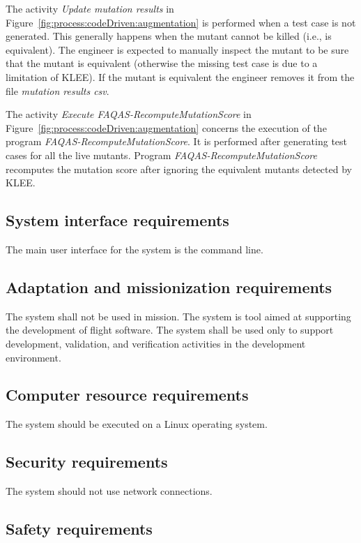 \RQ{} The activity \emph{Update mutation results} in Figure~\ref{fig:process:codeDriven:augmentation} is performed when a test case is not generated. This generally happens when the mutant cannot be killed (i.e., is equivalent). The engineer is expected to manually inspect the mutant to be sure that the mutant is equivalent (otherwise the missing test case is due to a limitation of KLEE). If the mutant is equivalent the engineer removes it from the file \emph{mutation results csv}.

\RQ{} The activity \emph{Execute FAQAS-RecomputeMutationScore} in Figure~\ref{fig:process:codeDriven:augmentation}  concerns the execution of the program \emph{FAQAS-RecomputeMutationScore}. It is performed after generating test cases for all the live mutants. Program \emph{FAQAS-RecomputeMutationScore} recomputes the mutation score after ignoring the equivalent mutants detected by KLEE.

\subsection{System interface requirements}

\RQ{} The main user interface for the system is the command line.

\subsection{Adaptation and missionization requirements }

\RQ{} The system shall not be used in mission. The system is tool aimed at supporting the development of flight software. The system shall be used only to support development, validation, and verification activities in the development environment. 

\subsection{Computer resource requirements}

\RQ{} The system should be executed on a Linux operating system.

\subsection{Security requirements }

\RQ{} The system should not use network connections.

\subsection{Safety requirements}

